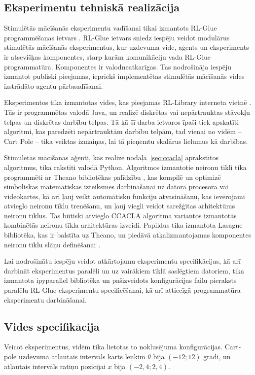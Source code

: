 \documentclass{ludis} %
\begin{document}
\subsection{Eksperimentu tehniskā realizācija}
Stimulētās mācīšanās eksperimentu vadīšanai tikai izmantots RL-Glue
programmēšanas ietvars \autocite{rl-glue}. RL-Glue ietvars sniedz iespēju veidot
modulārus stimulētās mācīšanās eksperimentus, kur uzdevuma vide, aģents un
eksperiments ir atsevišķas komponentes, starp kurām komunikāciju vada RL-Glue
programmatūra. Komponentes ir valodneatkarīgas. Tas nodrošināja iespēju izmantot
publiski pieejamas, iepriekš implementētas stimulētās mācīšanās vides izstrādāto
aģentu pārbaudīšanai. 

Eksperimentos tika izmantotas vides, kas pieejamas RL-Library interneta vietnē
\autocite{rl-library}. Tās ir programmētas valodā Java, un realizē diskrētas vai
nepārtrauktas stāvokļu telpas un diskrētas darbību telpas. Tā kā šī darba
ietvaros īpaši tiek apskatīti algoritmi, kas paredzēti nepārtrauktām darbību
telpām, tad vienai no vidēm -- Cart Pole -- tika veiktas izmaiņas, lai tā
pieņemtu skalārus lielumus kā darbības.

Stimulētās mācīšanās aģenti, kas realizē nodaļā~\ref{sec:ccacla} aprakstītos
algoritmus, tika rakstīti valodā Python. Algoritmos izmantotie neironu tīkli
tika programmēti ar Theano bibliotēkas palīdzību \autocite{Bastien-Theano-2012}
\autocite{bergstra+al:2010-scipy}, kas kompilē un optimizē simboliskas
matemātiskas izteiksmes darbināšanai uz datora procesora vai videokartes, kā arī
ļauj veikt automātisku funkciju atvasināšanu, kas ievērojami atvieglo neironu
tīklu trenēšanu, un ļauj viegli veidot sarežģītas arhitektūras neironu tīklus.
Tas būtiski atvieglo CCACLA algoritma variantos izmantotās kombinētās neironu
tīkla arhitektūras izveidi. Papildus tika izmantota Lasagne bibliotēka, kas ir
balstīta uz Theano, un piedāvā atkalizmantojamas komponentes neironu tīklu slāņu
definēšanai \autocite{lasagne}.

Lai nodrošinātu iespēju veidot atkārtojamu eksperimentu specifikācijas, kā arī
darbināt eksperimentus paralēli un uz vairākiem tīklā saslēgtiem datoriem, tika
izmantota ipyparallel bibliotēka \autocite{ipyparallel} un pašizveidots
konfigurācijas failu pieraksts paralēlu RL-Glue eksperimentu specificēšanai, kā
arī attiecīgā programmatūra eksperimentu darbināšanai.

\subsection{Vides specifikācija}
Veicot eksperimentus, vidēm tika lietotas to noklusējuma konfigurācijas.
Cart-pole uzdevumā atļautais intervāls kārts leņķim $\theta$ bija $(-12; 12)$
grādi, un atļautais intervāls ratiņu pozīcijai $x$ bija $(-2,4; 2,4)$.
\end{document}
